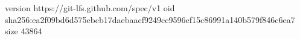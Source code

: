 version https://git-lfs.github.com/spec/v1
oid sha256:ea2f09bd6d575ebcb17daebaacf9249cc9596ef15c86991a140b579f846c6ea7
size 43864
